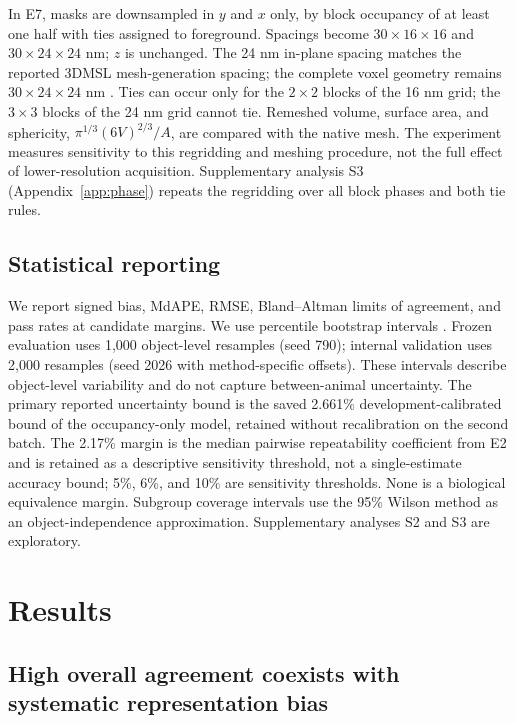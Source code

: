 \documentclass[journal]{IEEEtran}
\begin{document}
In E7, masks are downsampled in $y$ and $x$ only, by block occupancy of at least one half with ties assigned to foreground. Spacings become $30\times16\times16$ and $30\times24\times24$ nm; $z$ is unchanged. The 24 nm in-plane spacing matches the reported 3DMSL mesh-generation spacing; the complete voxel geometry remains $30\times24\times24$ nm \cite{ref20}. Ties can occur only for the $2\times2$ blocks of the 16 nm grid; the $3\times3$ blocks of the 24 nm grid cannot tie. Remeshed volume, surface area, and sphericity, $\pi^{1/3}(6V)^{2/3}/A$, are compared with the native mesh. The experiment measures sensitivity to this regridding and meshing procedure, not the full effect of lower-resolution acquisition. Supplementary analysis S3 (Appendix~\ref{app:phase}) repeats the regridding over all block phases and both tie rules.

\subsection{Statistical reporting}

We report signed bias, MdAPE, RMSE, Bland--Altman limits of agreement, and pass rates at candidate margins. We use percentile bootstrap intervals \cite{ref27}. Frozen evaluation uses 1,000 object-level resamples (seed 790); internal validation uses 2,000 resamples (seed 2026 with method-specific offsets). These intervals describe object-level variability and do not capture between-animal uncertainty. The primary reported uncertainty bound is the saved 2.661\% development-calibrated bound of the occupancy-only model, retained without recalibration on the second batch. The 2.17\% margin is the median pairwise repeatability coefficient from E2 and is retained as a descriptive sensitivity threshold, not a single-estimate accuracy bound; 5\%, 6\%, and 10\% are sensitivity thresholds. None is a biological equivalence margin. Subgroup coverage intervals use the 95\% Wilson method as an object-independence approximation. Supplementary analyses S2 and S3 are exploratory.

\section{Results}

\subsection{High overall agreement coexists with systematic representation bias}
\end{document}
